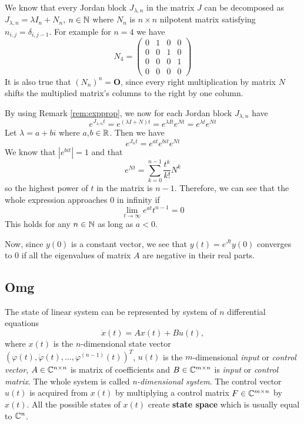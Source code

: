We know that every Jordan block $J_{\lambda,n}$ in the matrix $J$ can be decomposed as $J_{\lambda,n}=\lambda I_n+N_n$, $n \in\mathbb{N}$ where $N_n$ is $n \times n$ nilpotent matrix satisfying $n_{i,j}=\delta_{i,j-1}$. For example for $n=4$ we have
\begin{equation*}
	N_4=
	\begin{pmatrix}
		0 & 1 & 0 & 0 \\
		0 & 0 & 1 & 0 \\
		0 & 0 & 0 & 1 \\
		0 & 0 & 0 & 0 
	\end{pmatrix}
\end{equation*}
It is also true that $(N_n)^n=\textbf{O}$, since every right multiplication by matrix $N$ shifts the multiplied matrix's columns to the right by one column. 

By using Remark \ref{rem:expprop}, we now for each Jordan block $J_{\lambda,n}$ have $$e^{J_{\lambda,n}t}=e^{(\lambda I + N)t}=e^{\lambda It}e^{Nt}=e^{\lambda t}e^{Nt}$$ Let $\lambda = a+bi$ where $a$,$b \in \mathbb{R}$. Then we have $$e^{J_nt}=e^{at}e^{bit}e^{Nt}$$ We know that $|e^{bit}|=1$ and that $$e^{Nt}=\sum^{n-1}_{k=0}\frac{t^k}{k!}N^k$$ so the highest power of $t$ in the matrix is $n-1$. Therefore, we can see that the whole expression approaches 0 in infinity if $$\lim_{t\to\infty}e^{at}t^{n-1}=0$$ This holds for any $n\in\mathbb{N}$ as long as $a<0$. 

Now, since $y(0)$ is a constant vector, we see that $y(t)=e^{Jt}y(0)$ converges to 0 if all the eigenvalues of matrix $A$ are negative in their real parts.

\subsection{Omg}

The state of linear system can be represented by system of $n$ differential equations $$\dot{x}(t)=Ax(t)+Bu(t),$$ where $x(t)$ is the $n$-dimensional state vector $(\varphi(t),\dot{\varphi}(t),\ldots,\varphi^{(n-1)}(t))^T$, $u(t)$ is the $m$-dimensional \textit{input} or \textit{control vector}, $A \in \mathbb{C} ^{n\times n}$ is matrix of coefficients and $B\in \mathbb{C} ^{m\times n}$ is \textit{input} or \textit{control matrix}. The whole system is called \textit{n-dimensional system}. The control vector $u(t)$ is acquired from $x(t)$ by multiplying a control matrix $F\in \mathbb{C} ^{m\times n}$ by $x(t)$. All the possible states of $x(t)$ create \textbf{state space} which is usually equal to $\mathbb{C}^n$. 

